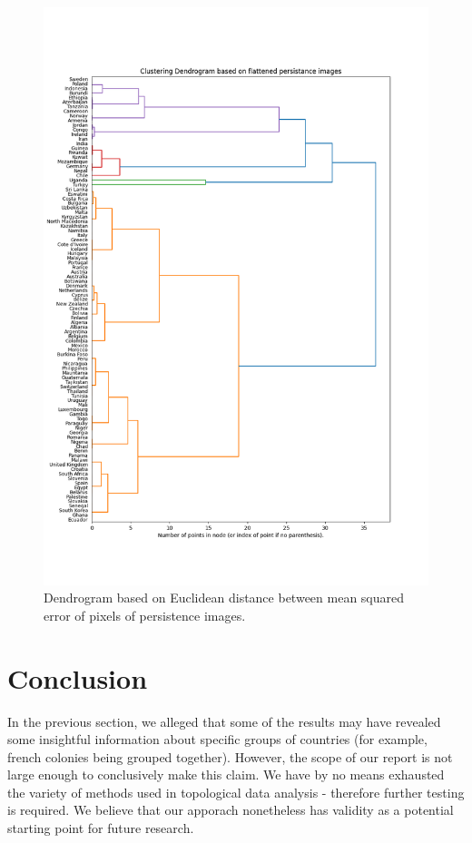 \documentclass[12pt]{article}
\begin{document}
\begin{figure}[t]
	\centering
	\includegraphics[width=15cm]{mse.png}
	\caption{Dendrogram based on Euclidean distance between mean squared error of pixels of persistence images.}
\end{figure}

\section{Conclusion}
In the previous section, we alleged that some of the results may have revealed some insightful information about specific groups of countries (for example, french colonies being grouped together). However, the scope of our report is not large enough to conclusively make this claim. We have by no means exhausted the variety of methods used in topological data analysis - therefore further testing is required. 
We believe that our apporach nonetheless has validity as a potential starting point for future research.
\end{document}
